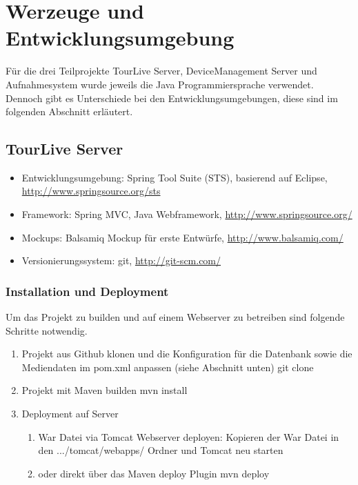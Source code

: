 \section{Werzeuge und Entwicklungsumgebung}
\label{sec:wekzeugeundentwicklungsumgebung}
Für die drei Teilprojekte TourLive Server, DeviceManagement Server und Aufnahmesystem wurde jeweils die Java Programmiersprache verwendet. Dennoch gibt es Unterschiede bei den Entwicklungsumgebungen, diese sind im folgenden Abschnitt erläutert.

\subsection{TourLive Server}
\begin{itemize}
\item Entwicklungsumgebung: Spring Tool Suite (STS), basierend auf Eclipse, \url{http://www.springsource.org/sts}
\item Framework: Spring MVC, Java Webframework, \url{http://www.springsource.org/}
\item Mockups: Balsamiq Mockup für erste Entwürfe, \url{http://www.balsamiq.com/}
\item Versionierungssystem: git, \url{http://git-scm.com/}
\end{itemize}

\subsubsection{Installation und Deployment}
Um das Projekt zu builden und auf einem Webserver zu betreiben sind folgende Schritte notwendig.
\begin{enumerate}
\item Projekt aus Github klonen und die Konfiguration für die Datenbank sowie die Mediendaten im pom.xml anpassen (siehe Abschnitt unten)
git clone
\item Projekt mit Maven builden
mvn install
\item Deployment auf Server
\begin{enumerate}
\item War Datei via Tomcat Webserver deployen:
Kopieren der War Datei in den .../tomcat/webapps/ Ordner und Tomcat neu starten
\item oder direkt über das Maven deploy Plugin
mvn deploy
\end{enumerate}
\end{enumerate}


